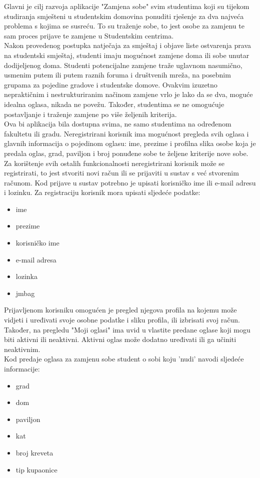 		Glavni je cilj razvoja aplikacije "Zamjena sobe" svim studentima koji su tijekom studiranja smješteni u studentskim domovina ponuditi rješenje za dva najveća problema s kojima se susreću. To su traženje sobe, to jest osobe za zamjenu te sam proces prijave te zamjene u Studentskim centrima.\\
		Nakon provedenog postupka natječaja za smještaj i objave liste ostvarenja prava na studentski smještaj, studenti imaju mogućnost zamjene doma ili sobe unutar dodijeljenog doma. 
		Studenti potencijalne zamjene traže uglavnom nasumično, usmenim putem ili putem raznih foruma i društvenih mreža, na posebnim grupama za pojedine gradove i studentske domove. Ovakvim izuzetno nepraktičnim i nestrukturiranim načinom zamjene vrlo je lako da se dva, moguće idealna oglasa, nikada ne povežu. Također, studentima se ne omogućuje postavljanje i traženje zamjene po više željenih kriterija.\\ 
		Ova bi aplikacija bila dostupna svima, ne samo studentima na određenom fakultetu ili gradu. Neregistrirani korisnik ima mogućnost pregleda svih oglasa i glavnih informacija o pojedinom oglasu: ime, prezime i profilna slika osobe koja je predala oglas, grad, paviljon i broj ponuđene sobe te željene kriterije nove sobe. Za korištenje svih ostalih funkcionalnosti neregistrirani korisnik može se registrirati, to jest stvoriti novi račun ili se prijaviti u sustav s već stvorenim računom. Kod prijave u sustav potrebno je upisati korisničko ime ili e-mail adresu i lozinku. Za registraciju korisnik mora upisati sljedeće podatke: 
		\begin{itemize}
			\item ime
			\item prezime
			\item korisničko ime
			\item e-mail adresa
			\item lozinka
			\item jmbag
		\end{itemize} 
		Prijavljenom korisniku omogućen je pregled njegova profila na kojemu može vidjeti i uređivati svoje osobne podatke i sliku profila, ili izbrisati svoj račun. Također, na pregledu "Moji oglasi" ima uvid u vlastite predane oglase koji mogu biti aktivni ili neaktivni. Aktivni oglas može dodatno uređivati ili ga učiniti neaktivnim.\\
		Kod predaje oglasa za zamjenu sobe student o sobi koju 'nudi' navodi sljedeće informacije:
		\begin{itemize}
			\item grad
			\item dom
			\item paviljon
			\item kat
			\item broj kreveta 
			\item tip kupaonice
		\end{itemize}
